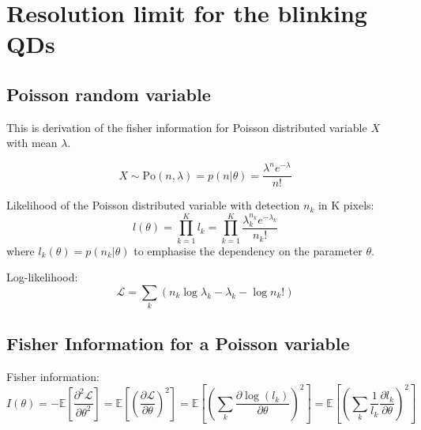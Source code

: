 \chapter{Resolution limit for the blinking QDs}

\section{Poisson random variable}

This is derivation of the fisher information for Poisson distributed variable $X$ with mean $\lambda$.

\begin{equation}
	X\sim\textrm{Po}(n,\lambda)=p(n|\theta)=\frac{\lambda^{n}e^{-\lambda}}{n!}
\end{equation}

Likelihood of the Poisson distributed variable with detection $n_{k}$ in K pixels: 
%
\begin{equation}
	l(\theta)=\prod_{k=1}^{K}l_{k}=\prod_{k=1}^{K}\frac{\lambda_{k}^{n_{k}}e^{-\lambda_{k}}}{n_{k}!}
	\label{eq:Likelihood of Poisson}
\end{equation}
%
where $l_{k}(\theta)=p(n_{k}|\theta)$ to emphasise the dependency on the parameter $\theta$.

Log-likelihood:
%
\begin{equation}
	\mathcal{L}=\sum_{k}\left(n_{k}\log\lambda_{k}-\lambda_{k}-\log n_{k}!\right)
\end{equation}

\section{Fisher Information for a Poisson variable\label{sub: Appendix Fisher-Information-Poisson}}

Fisher information:
%
\begin{equation}
	I(\theta)=-\mathbb{E}\left[\frac{\partial^{2}\mathcal{L}}{\partial\theta^{2}}\right]=\mathbb{E}\left[\left(\frac{\partial\mathcal{L}}{\partial\theta}\right)^{2}\right]=\mathbb{E}\left[\left(\sum_{k}\frac{\partial\log(l_{k})}{\partial\theta}\right)^{2}\right]=\mathbb{E}\left[\left(\sum_{k}\frac{1}{l_{k}}\frac{\partial l_{k}}{\partial\theta}\right)^{2}\right]
	\label{eq:Fisher Info Definition}
\end{equation}

